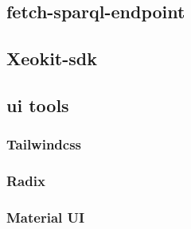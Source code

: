 \subsection{fetch-sparql-endpoint}


\subsection{Xeokit-\acs{sdk}}

\subsection{\acs{ui} tools}

\subsubsection{Tailwindcss}
\subsubsection{Radix}
\subsubsection{Material UI}
